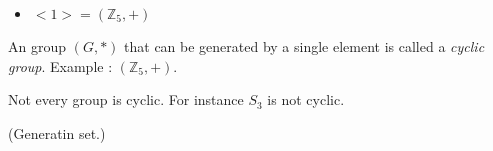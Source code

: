 \begin{eg}
\begin{itemize}
\item $<1> = (\mathbb{Z}_5,+)$
\end{itemize}
\end{eg}


\begin{defn}An group $(G,*)$ that can be generated by a single element is called a {\em cyclic group}. Example : $(\mathbb{Z}_5,+)$.
\end{defn}

Not every group is cyclic. For instance $S_3$ is not cyclic.

\begin{defn}(Generatin set.)

\end{defn}

